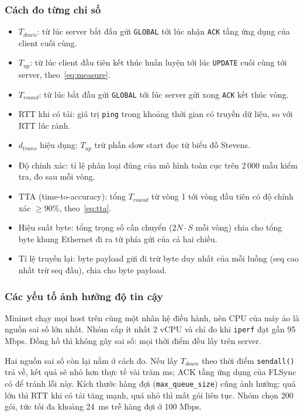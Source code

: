 \subsubsection{Cách đo từng chỉ số}
\begin{itemize}
    \item $T_{down}$: từ lúc server bắt đầu gửi \texttt{GLOBAL} tới lúc nhận \texttt{ACK} tầng ứng dụng của client cuối cùng.
    \item $T_{up}$: từ lúc client đầu tiên kết thúc huấn luyện tới lúc \texttt{UPDATE} cuối cùng tới server, theo~\eqref{eq:measure}.
    \item $T_{round}$: từ lúc bắt đầu gửi \texttt{GLOBAL} tới lúc server gửi xong \texttt{ACK} kết thúc vòng.
    \item RTT khi có tải: giá trị \texttt{ping} trong khoảng thời gian có truyền dữ liệu, so với RTT lúc rảnh.
    \item $d_{trans}$ hiệu dụng: $T_{up}$ trừ phần slow start đọc từ biểu đồ Stevens.
    \item Độ chính xác: tỉ lệ phân loại đúng của mô hình toàn cục trên 2\,000 mẫu kiểm tra, đo sau mỗi vòng.
    \item TTA (time-to-accuracy): tổng $T_{round}$ từ vòng 1 tới vòng đầu tiên có độ chính xác $\geq 90\%$, theo~\eqref{eq:tta}.
    \item Hiệu suất byte: tổng trọng số cần chuyển ($2 N \cdot S$ mỗi vòng) chia cho tổng byte khung Ethernet đi ra từ phía gửi của cả hai chiều.
    \item Tỉ lệ truyền lại: byte payload gửi đi trừ byte duy nhất của mỗi luồng (seq cao nhất trừ seq đầu), chia cho byte payload.
\end{itemize}

\subsubsection{Các yếu tố ảnh hưởng độ tin cậy}
Mininet chạy mọi host trên cùng một nhân hệ điều hành, nên CPU của máy ảo là nguồn sai số lớn nhất. Nhóm cấp ít nhất 2 vCPU và chỉ đo khi \texttt{iperf} đạt gần 95 Mbps. Đồng hồ thì không gây sai số: mọi thời điểm đều lấy trên server.

Hai nguồn sai số còn lại nằm ở cách đo. Nếu lấy $T_{down}$ theo thời điểm \texttt{sendall()} trả về, kết quả sẽ nhỏ hơn thực tế vài trăm ms; ACK tầng ứng dụng của FLSync có để tránh lỗi này. Kích thước hàng đợi (\nolinkurl{max_queue_size}) cũng ảnh hưởng: quá lớn thì RTT khi có tải tăng mạnh, quá nhỏ thì mất gói liên tục. Nhóm chọn 200 gói, tức tối đa khoảng 24~ms trễ hàng đợi ở 100 Mbps.

